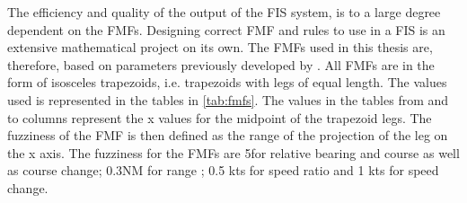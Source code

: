 The efficiency and quality of the output of the FIS system, is to a large degree dependent on the FMFs. Designing correct FMF and rules to use in a FIS is an extensive mathematical project on its own. The FMFs used in this thesis are, therefore, based on parameters  previously developed by \textcite{perera2010smooth_param}. All FMFs are in the form of isosceles trapezoids, i.e. trapezoids with legs of equal length. The values used is represented in the tables in \ref{tab:fmfs}. The values in the tables from and to columns represent the x values for the midpoint of the trapezoid legs. The fuzziness of the FMF is then defined as the range of the projection of the leg on the x axis. The fuzziness for the FMFs are 5\textdegree for relative bearing and course as well as course change; 0.3NM for range ; 0.5 kts for speed ratio and 1 kts for speed change.

